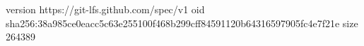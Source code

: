 version https://git-lfs.github.com/spec/v1
oid sha256:38a985ce0eacc5c63e255100f468b299cff84591120b64316597905fc4e7f21e
size 264389
